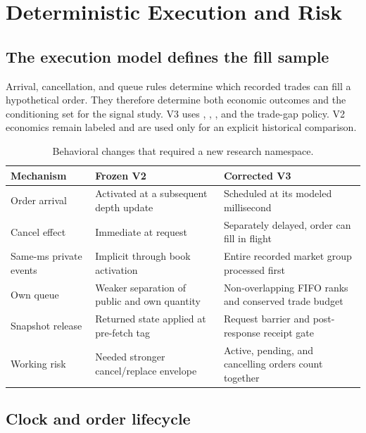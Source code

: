 \section{Deterministic Execution and Risk}

\subsection{The execution model defines the fill sample}

Arrival, cancellation, and queue rules determine which recorded trades can
fill a hypothetical order. They therefore determine both economic outcomes
and the conditioning set for the signal study. V3 uses \CurrentModel,
,
, and the
 trade-gap policy. V2 economics remain labeled
\LegacyModel{} and are used only for an explicit historical comparison.

\begin{table}[H]
\centering
\caption{Behavioral changes that required a new research namespace.}
\begin{tabularx}{\textwidth}{@{}L{0.22\textwidth}YY@{}}
\toprule
Mechanism & Frozen V2 & Corrected V3 \\
\midrule
Order arrival & Activated at a subsequent depth update & Scheduled at its modeled millisecond \\
Cancel effect & Immediate at request & Separately delayed, order can fill in flight \\
Same-ms private events & Implicit through book activation & Entire recorded market group processed first \\
Own queue & Weaker separation of public and own quantity & Non-overlapping FIFO ranks and conserved trade budget \\
Snapshot release & Returned state applied at pre-fetch tag & Request barrier and post-response receipt gate \\
Working risk & Needed stronger cancel/replace envelope & Active, pending, and cancelling orders count together \\
\bottomrule
\end{tabularx}
\end{table}

\subsection{Clock and order lifecycle}

